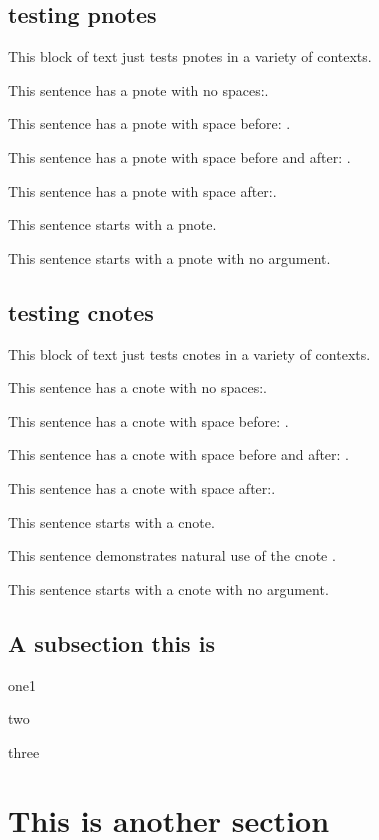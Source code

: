 \documentclass[final]{compact_proposal}
\begin{document}
\subsection{testing pnotes}

This block of text just tests pnotes in a variety of contexts.

This sentence has a pnote with no spaces:.

This sentence has a pnote with space before: .

This sentence has a pnote with space before and after:  .

This sentence has a pnote with space after: .

 This sentence starts with a pnote.

\pnote This sentence starts with a pnote with no argument.



\subsection{testing cnotes}

This block of text just tests cnotes in a variety of contexts.

This sentence has a cnote with no spaces:.

This sentence has a cnote with space before: .

This sentence has a cnote with space before and after:  .

This sentence has a cnote with space after: .

 This sentence starts with a cnote.

This sentence demonstrates natural use of the cnote \cnote.

\cnote This sentence starts with a cnote with no argument.



\subsection{A subsection this is}
\blindtext[1]
\begin{tightitemize}
	\item one1
	\item two
	\item three
\end{tightitemize}



\section{This is another section}
\blindtext[6]
\end{document}
